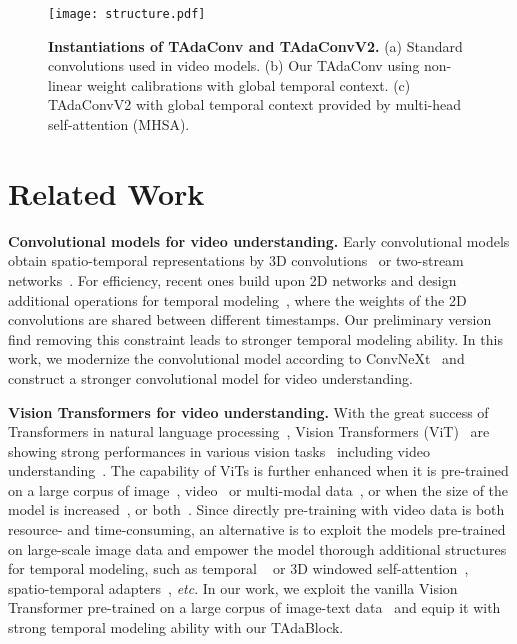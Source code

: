 \documentclass[10pt,journal,compsoc]{IEEEtran}
\begin{document}
\begin{figure*}[t]
\centering
\texttt{[image: structure.pdf]}
\caption{
\textbf{Instantiations of TAdaConv and TAdaConvV2. }
(a) Standard convolutions used in video models. 
(b) Our TAdaConv using non-linear weight calibrations with global temporal context.
(c) TAdaConvV2 with global temporal context provided by multi-head self-attention (MHSA).
}
\vspace{-4mm}
\label{fig:tadaconvinstantiation}
\end{figure*}

\section{Related Work}

\textbf{Convolutional models for video understanding. }
Early convolutional models obtain spatio-temporal representations by 3D convolutions~\cite{i3d,c3d,x3d,csn} or two-stream networks~\cite{twostream}.
For efficiency, recent ones build upon 2D networks and design additional operations for temporal modeling~\cite{tsm,tdn,stm,r21d,tam,corrnet,wang2023e3d,smallbignet,zhou2023gcm}, where the weights of the 2D convolutions are shared between different timestamps. 
Our preliminary version~\cite{huangtada} find removing this constraint leads to stronger temporal modeling ability. 
In this work, we modernize the convolutional model according to ConvNeXt~\cite{convnext} and construct a stronger convolutional model for video understanding.

\textbf{Vision Transformers for video understanding.} 
With the great success of Transformers in natural language processing~\cite{vaswani2017attention,kenton2019bert,radford2018gpt}, Vision Transformers (ViT)~\cite{dosovitskiy2020vit} are showing strong performances in various vision tasks~\cite{mvit,meinhardt2022trackformer,cao2022tctrack,bao2021beit,zhou2022pttr,ramesh2022dalle2,carion2020detr} including video understanding~\cite{nonlocal,videoswin,arnab2021vivit,timesformer,liu2022tadtr,chen2023videollm,patrick2021motionformer}.
The capability of ViTs is further enhanced when it is pre-trained on a large corpus of image~\cite{chen2021mocov3,he2022mae}, video~\cite{tong2022videomae,feichtenhofer2022maest,qing2023hico} or multi-modal data~\cite{radford2021clip,yu2022coca}, or when the size of the model is increased~\cite{zhai2022scaling,dehghani2023scaling22b}, or both~\cite{wang2022beitv3,wang2023videomaev2}. 
Since directly pre-training with video data is both resource- and time-consuming, an alternative is to exploit the models pre-trained on large-scale image data and empower the model thorough additional structures for temporal modeling, such as temporal ~\cite{timesformer} or 3D windowed self-attention~\cite{videoswin}, spatio-temporal adapters~\cite{pan2022stadapter}, \textit{etc}.
In our work, we exploit the vanilla Vision Transformer pre-trained on a large corpus of image-text data~\cite{radford2021clip} and equip it with strong temporal modeling ability with our TAdaBlock.
\end{document}
